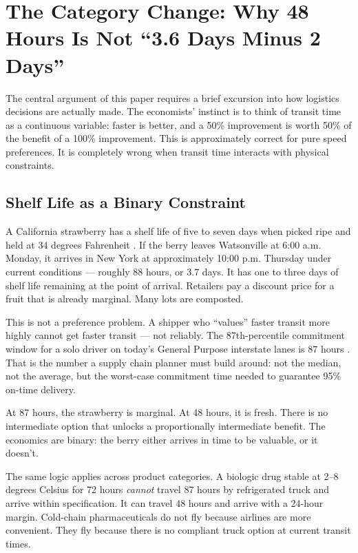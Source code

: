 \section{The Category Change: Why 48 Hours Is Not ``3.6 Days Minus 2 Days''}
\label{sec:category}

The central argument of this paper requires a brief excursion into how logistics decisions
are actually made. The economists' instinct is to think of transit time as a continuous
variable: faster is better, and a 50\% improvement is worth 50\% of the benefit of a
100\% improvement. This is approximately correct for pure speed preferences. It is
completely wrong when transit time interacts with physical constraints.

\subsection{Shelf Life as a Binary Constraint}

A California strawberry has a shelf life of five to seven days when picked ripe and held
at 34 degrees Fahrenheit \citep{USDA_NASS2023}. If the berry leaves Watsonville at 6:00 a.m.
Monday, it arrives in New York at approximately 10:00 p.m. Thursday under current conditions ---
roughly 88 hours, or 3.7 days. It has one to three days of shelf life remaining at the
point of arrival. Retailers pay a discount price for a fruit that is already marginal.
Many lots are composted.

This is not a preference problem. A shipper who ``values'' faster transit more highly
cannot get faster transit --- not reliably. The 87th-percentile commitment window for
a solo driver on today's General Purpose interstate lanes is 87 hours \citep{ROUTE_C1}.
That is the number a supply chain planner must build around: not the median, not the
average, but the worst-case commitment time needed to guarantee 95\% on-time delivery.

At 87 hours, the strawberry is marginal. At 48 hours, it is fresh. There is no intermediate
option that unlocks a proportionally intermediate benefit. The economics are binary:
the berry either arrives in time to be valuable, or it doesn't.

The same logic applies across product categories. A biologic drug stable at 2--8 degrees
Celsius for 72 hours \textit{cannot} travel 87 hours by refrigerated truck and arrive
within specification. It can travel 48 hours and arrive with a 24-hour margin. Cold-chain
pharmaceuticals do not fly because airlines are more convenient. They fly because there is
no compliant truck option at current transit times.

